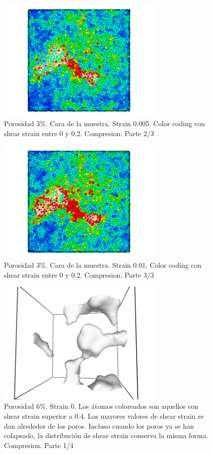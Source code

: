 \documentclass[10pt, oneside]{article} %
\begin{document}
\begin{figure}[H]
\centering
\includegraphics[width=8cm]{Figures/porosidad_3_faceAS_0_02_0005.png}
\caption{Porosidad 3\%. Cara de la muestra. Strain 0.005. Color coding con shear strain entre 0 y 0.2. Compresion. Parte 2/3}
\end{figure}

\begin{figure}[H]
\centering
\includegraphics[width=8cm]{Figures/porosidad_3_faceAS_0_02_001.png}
\caption{Porosidad 3\%. Cara de la muestra. Strain 0.01. Color coding con shear strain entre 0 y 0.2. Compresion. Parte 3/3}
\end{figure}

\begin{figure}[H]
\centering
\includegraphics[width=8cm]{Figures/porosidad_6_shearstrain04_0.png}
\caption{Porosidad 6\%. Strain 0. Los átomos coloreados son aquellos con shear strain superior a 0.4. Los mayores valores de shear strain se dan alrededor de los poros. Incluso cuando los poros ya se han colapsado, la distribución de shear strain conserva la misma forma. Compresion. Parte 1/4}
\end{figure}
\end{document}
